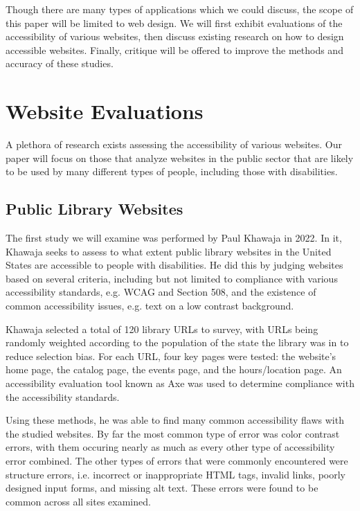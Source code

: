 \documentclass{article}
\begin{document}
Though there are many types of applications which we could discuss, the scope of this paper will be limited to web design.
We will first exhibit evaluations of the accessibility of various websites, then discuss existing research on how to design accessible websites.
Finally, critique will be offered to improve the methods and accuracy of these studies.


\section{Website Evaluations}
A plethora of research exists assessing the accessibility of various websites.
Our paper will focus on those that analyze websites in the public sector that are likely to be used by many different types of people, including those with disabilities.


\subsection{Public Library Websites}
The first study we will examine was performed by Paul Khawaja in 2022.
\cite{Library}
In it, Khawaja seeks to assess to what extent public library websites in the United States are accessible to people with disabilities.
He did this by judging websites based on several criteria, including but not limited to compliance with various accessibility standards, e.g. WCAG and Section 508, and the existence of common accessibility issues, e.g. text on a low contrast background.

Khawaja selected a total of 120 library URLs to survey, with URLs being randomly weighted according to the population of the state the library was in to reduce selection bias.
For each URL, four key pages were tested: the website's home page, the catalog page, the events page, and the hours/location page.
An accessibility evaluation tool known as Axe was used to determine compliance with the accessibility standards.
\cite{Axe}

Using these methods, he was able to find many common accessibility flaws with the studied websites.
By far the most common type of error was color contrast errors, with them occuring nearly as much as every other type of accessibility error combined.
The other types of errors that were commonly encountered were structure errors, i.e. incorrect or inappropriate HTML tags, invalid links, poorly designed input forms, and missing alt text.
These errors were found to be common across all sites examined.
\end{document}
